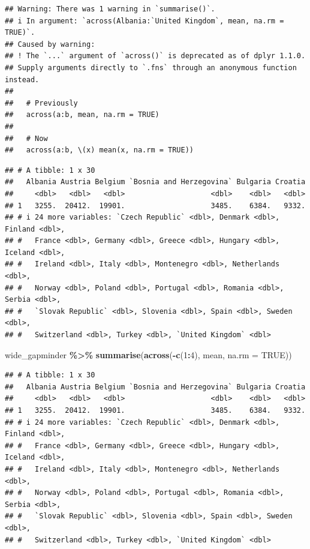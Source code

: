 \documentclass[
]{book}
\newenvironment{Shaded}{\begin{snugshade}}{\end{snugshade}}
\newcommand{\AttributeTok}[1]{\textcolor[rgb]{0.13,0.29,0.53}{#1}}
\newcommand{\ConstantTok}[1]{\textcolor[rgb]{0.56,0.35,0.01}{#1}}
\newcommand{\DecValTok}[1]{\textcolor[rgb]{0.00,0.00,0.81}{#1}}
\newcommand{\FunctionTok}[1]{\textcolor[rgb]{0.13,0.29,0.53}{\textbf{#1}}}
\newcommand{\NormalTok}[1]{#1}
\newcommand{\SpecialCharTok}[1]{\textcolor[rgb]{0.81,0.36,0.00}{\textbf{#1}}}
\begin{document}
\begin{verbatim}
## Warning: There was 1 warning in `summarise()`.
## i In argument: `across(Albania:`United Kingdom`, mean, na.rm = TRUE)`.
## Caused by warning:
## ! The `...` argument of `across()` is deprecated as of dplyr 1.1.0.
## Supply arguments directly to `.fns` through an anonymous function instead.
## 
##   # Previously
##   across(a:b, mean, na.rm = TRUE)
## 
##   # Now
##   across(a:b, \(x) mean(x, na.rm = TRUE))
\end{verbatim}

\begin{verbatim}
## # A tibble: 1 x 30
##   Albania Austria Belgium `Bosnia and Herzegovina` Bulgaria Croatia
##     <dbl>   <dbl>   <dbl>                    <dbl>    <dbl>   <dbl>
## 1   3255.  20412.  19901.                    3485.    6384.   9332.
## # i 24 more variables: `Czech Republic` <dbl>, Denmark <dbl>, Finland <dbl>,
## #   France <dbl>, Germany <dbl>, Greece <dbl>, Hungary <dbl>, Iceland <dbl>,
## #   Ireland <dbl>, Italy <dbl>, Montenegro <dbl>, Netherlands <dbl>,
## #   Norway <dbl>, Poland <dbl>, Portugal <dbl>, Romania <dbl>, Serbia <dbl>,
## #   `Slovak Republic` <dbl>, Slovenia <dbl>, Spain <dbl>, Sweden <dbl>,
## #   Switzerland <dbl>, Turkey <dbl>, `United Kingdom` <dbl>
\end{verbatim}

\begin{Shaded}
\begin{Highlighting}[]
\NormalTok{wide\_gapminder }\SpecialCharTok{\%\textgreater{}\%}
  \FunctionTok{summarise}\NormalTok{(}\FunctionTok{across}\NormalTok{(}\SpecialCharTok{{-}}\FunctionTok{c}\NormalTok{(}\DecValTok{1}\SpecialCharTok{:}\DecValTok{4}\NormalTok{), mean, }\AttributeTok{na.rm =} \ConstantTok{TRUE}\NormalTok{))}
\end{Highlighting}
\end{Shaded}

\begin{verbatim}
## # A tibble: 1 x 30
##   Albania Austria Belgium `Bosnia and Herzegovina` Bulgaria Croatia
##     <dbl>   <dbl>   <dbl>                    <dbl>    <dbl>   <dbl>
## 1   3255.  20412.  19901.                    3485.    6384.   9332.
## # i 24 more variables: `Czech Republic` <dbl>, Denmark <dbl>, Finland <dbl>,
## #   France <dbl>, Germany <dbl>, Greece <dbl>, Hungary <dbl>, Iceland <dbl>,
## #   Ireland <dbl>, Italy <dbl>, Montenegro <dbl>, Netherlands <dbl>,
## #   Norway <dbl>, Poland <dbl>, Portugal <dbl>, Romania <dbl>, Serbia <dbl>,
## #   `Slovak Republic` <dbl>, Slovenia <dbl>, Spain <dbl>, Sweden <dbl>,
## #   Switzerland <dbl>, Turkey <dbl>, `United Kingdom` <dbl>
\end{verbatim}
\end{document}
